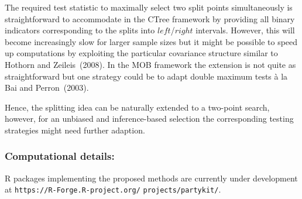 \documentclass[twoside]{report}
\begin{document}
The required test statistic to maximally select two split points simultaneously is straightforward
to accommodate in the CTree framework by providing all binary indicators corresponding
to the splits into $\mathit{left}$/$\mathit{right}$ intervals. However, this will become
increasingly slow for larger sample sizes but it might be possible to speed up computations by
exploiting the particular covariance structure similar to Hothorn and Zeileis~(2008). In the
MOB framework the extension is not quite as straightforward but one strategy could be to
adapt double maximum tests \`a la Bai and Perron~(2003).

Hence, the splitting idea can be naturally extended to a two-point search, however, for 
an unbiased and inference-based selection the corresponding testing strategies might need
further adaption.

\bigskip

\subsubsection*{Computational details:}
\textsf{R} packages implementing the proposed methods are currently under development at
\texttt{https://R-Forge.R-project.org/} \texttt{projects/partykit/}.



\bigskip
\end{document}
